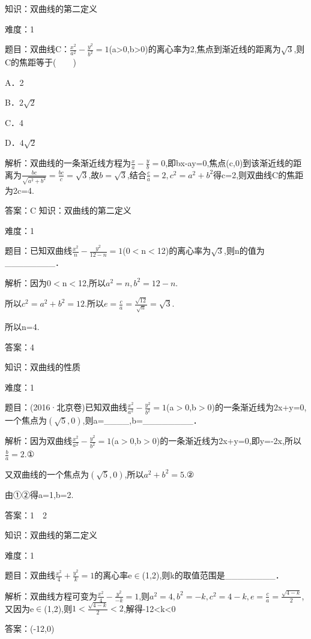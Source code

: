 \documentclass{article} %
\begin{document}
知识：双曲线的第二定义

难度：1

题目：双曲线C：$\frac{x^2}{a^2}-\frac{y^2}{b^2}=1$(a>0,b>0)的离心率为2,焦点到渐近线的距离为$\sqrt{3}$,则C的焦距等于(　　)

A．2  

B．$2\sqrt{2}$  

C．4  

D．$4\sqrt{2}$

解析：双曲线的一条渐近线方程为$\frac{x}{a}-\frac{y}{b}=0$,即bx-ay=0,焦点(c,0)到该渐近线的距离为$\frac{bc}{\sqrt{a^2+b^2}}=\frac{bc}{c}=\sqrt{3}$,故$b=\sqrt{3}$,结合$\frac{c}{a}=2,c^{2}=a^{2}+b^{2}$得c=2,则双曲线C的焦距为2c=4.

答案：C
知识：双曲线的第二定义

难度：1

题目：已知双曲线$\frac{x^2}{n}-\frac{y^2}{12-n}=1$(0${<}$n${<}$12)的离心率为$\sqrt{3}$,则n的值为\_\_\_\_\_\_\_\_．

解析：因为0${<}$n${<}$12,所以$a^{2}=n,b^{2}=12-n$.

所以$c^{2}=a^{2}+b^{2}=12$.所以$e=\frac{c}{a}=\frac{\sqrt{12}}{\sqrt{n}}=\sqrt{3}$.

所以n=4.

答案：4



知识：双曲线的性质

难度：1

题目：(2016·北京卷)已知双曲线$\frac{x^2}{a^2}-\frac{y^2}{b^2}=1$(a${>}$0,b${>}$0)的一条渐近线为2x+y=0,一个焦点为$(\sqrt{5},0)$,则a=\_\_\_\_,b=\_\_\_\_\_\_\_\_．

解析：因为双曲线$\frac{x^2}{a^2}-\frac{y^2}{b^2}=1$(a${>}$0,b${>}$0)的一条渐近线为2x+y=0,即y=-2x,所以$\frac{b}{a}=2$.①

又双曲线的一个焦点为$(\sqrt{5},0)$,所以$a^{2}+b^{2}=5$.②

由①②得a=1,b=2.

答案：1　2



知识：双曲线的第二定义

难度：1

题目：双曲线$\frac{x^2}{4}+\frac{y^2}{k}=1$的离心率e${\in}$(1,2),则k的取值范围是\_\_\_\_\_\_\_\_．

解析：双曲线方程可变为$\frac{x^2}{4}-\frac{y^2}{-k}=1$,则$a^{2}=4,b^{2}=-k,c^{2}=4-k,e=\frac{c}{a}=\frac{\sqrt{4-k}}{2}$,又因为e${\in}$(1,2),则$1<\frac{\sqrt{4-k}}{2}<2$,解得-12<k<0

答案：(-12,0)
\end{document}
